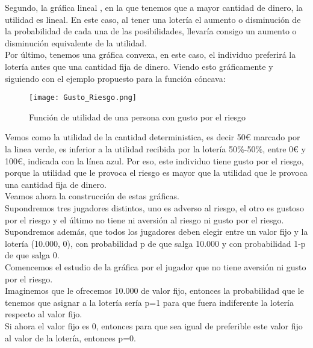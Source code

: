\documentclass[10pt,a4paper]{book}
\begin{document}
Segundo, la gráfica lineal , en la que tenemos que a mayor cantidad de dinero, la utilidad es lineal. En este caso, al tener una lotería el aumento o disminución de la probabilidad de cada una de las posibilidades, llevaría consigo un aumento o disminución equivalente de la utilidad.\\

Por último, tenemos una gráfica convexa, en este caso, el individuo preferirá la lotería antes que una cantidad fija de dinero. Viendo esto gráficamente y siguiendo con el ejemplo propuesto para la función cóncava:\\

\begin{figure}[htb]
\centering
\texttt{[image: Gusto\_Riesgo.png]}
\caption{Función de utilidad de una persona con gusto por el riesgo}
\end{figure} 

Vemos como la utilidad de la cantidad deterministica, es decir 50€ marcado por la linea verde, es inferior a la utilidad recibida por la lotería 50$\%$-50$\%$, entre 0€ y 100€, indicada con la línea azul. Por eso, este individuo tiene gusto por el riesgo, porque la utilidad que le provoca el riesgo es mayor que la utilidad que le provoca una cantidad fija de dinero.\\


Veamos ahora la construcción de estas gráficas.\\

Supondremos tres jugadores distintos, uno es adverso al riesgo, el otro es gustoso por el riesgo y el último no tiene ni aversión al riesgo ni gusto por el riesgo.\\

Supondremos además, que todos los jugadores deben elegir entre un valor fijo y la lotería (10.000, 0), con probabilidad p de que salga 10.000 y con probabilidad 1-p de que salga 0.\\

Comencemos el estudio de la gráfica por el jugador que no tiene aversión ni gusto por el riesgo.\\

Imaginemos que le ofrecemos 10.000 de valor fijo, entonces la probabilidad que le tenemos que asignar a la lotería sería p=1 para que fuera indiferente la lotería respecto al valor fijo.\\

Si ahora el valor fijo es 0, entonces para que sea igual de preferible este valor fijo al valor de la lotería, entonces p=0.\\
\end{document}
